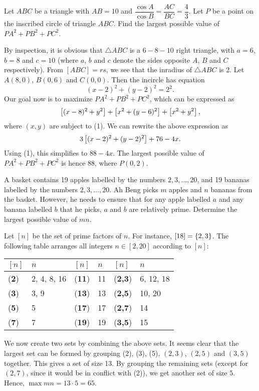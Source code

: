 \begin{question}[88]\label{A::2021-O-1-18}
    Let $ABC$ be a triangle with $AB = 10$ and $\dfrac{\cos A}{\cos B} = \dfrac{AC}{BC} = \dfrac43$. Let $P$ be a point on the inscribed circle of triangle $ABC$. Find the largest possible value of $PA^2 + PB^2 + PC^2$.
\end{question}
\begin{solution*}
    By inspection, it is obvious that $\triangle ABC$ is a $6-8-10$ right triangle, with $a = 6$, $b = 8$ and $c = 10$ (where $a$, $b$ and $c$ denote the sides opposite $A$, $B$ and $C$ respectively). From $[ABC] = rs$, we see that the inradius of $\triangle ABC$ is 2. Let $A(8, 0)$, $B(0, 6)$ and $C(0, 0)$. Then the incircle has equation \[(x-2)^2 + (y-2)^2 = 2^2. \tag{1}\] Our goal now is to maximize $PA^2 + PB^2 + PC^2$, which can be expressed as \[\left[ (x-8)^2 + y^2 \right] + \left[ x^2 + (y-6)^2 \right] + \left[ x^2 + y^2 \right],\] where $(x, y)$ are subject to (1). We can rewrite the above expression as \[3\left[ (x-2)^2 + (y-2)^2 \right] + 76 - 4x.\] Using (1), this simplifies to $88 - 4x$. The largest possible value of $PA^2 + PB^2 + PC^2$ is hence 88, where $P(0, 2)$.
\end{solution*}

\begin{question}[65]\label{A::2021-O-1-19}
    A basket contains 19 apples labelled by the numbers $2, 3, \ldots, 20$, and 19 bananas labelled by the numbers $2, 3, \ldots, 20$. Ah Beng picks $m$ apples and $n$ bananas from the basket. However, he needs to ensure that for any apple labelled $a$ and any banana labelled $b$ that he picks, $a$ and $b$ are relatively prime. Determine the largest possible value of $mn$.
\end{question}
\begin{solution*}
    Let $[n]$ be the set of prime factors of $n$. For instance, $[18] = \left\lbrace 2, 3 \right\rbrace$. The following table arranges all integers $n \in [2, 20]$ according to $[n]$:
    \begin{table}[h]
        \centering
        \begin{tabular}{|l|l|l|l|l|l|}
        \hline
        $[n]$ & $n$ & $[n]$ & $n$ & $[n]$ & $n$ \\ \hline
        (\textbf{2}) & 2, 4, 8, 16 & (\textbf{11}) & 11 & (\textbf{2,3}) & 6, 12, 18 \\ \hline
        (\textbf{3}) & 3, 9 & (\textbf{13}) & 13 & (\textbf{2,5}) & 10, 20 \\ \hline
        (\textbf{5}) & 5 & (\textbf{17}) & 17 & (\textbf{2,7}) & 14 \\ \hline
        (\textbf{7}) & 7 & (\textbf{19}) & 19 & (\textbf{3,5}) & 15 \\ \hline
        \end{tabular}
    \end{table}
    
    We now create two sets by combining the above sets. It seems clear that the largest set can be formed by grouping (2), (3), (5), $(2, 3)$, $(2, 5)$ and $(3, 5)$ together. This gives a set of size 13. By grouping the remaining sets (except for $(2, 7)$, since it would be in conflict with (2)), we get another set of size $5$. Hence, $\max mn = 13 \cdot 5 = 65$.
\end{solution*}

